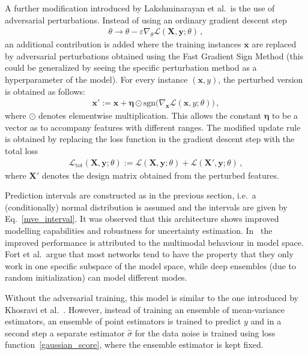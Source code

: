 \documentclass[smallcondensed]{svjour3}
\begin{document}
    A further modification introduced by Lakshminarayan et al.\ is the use of adversarial perturbations. Instead of using an ordinary gradient descent step
    \begin{gather}
        \theta\longrightarrow\theta - \varepsilon\nabla_\theta\mathcal{L}(\mathbf{X},\mathbf{y};\theta)\,,
    \end{gather}
    an additional contribution is added where the training instances $\mathbf{x}$ are replaced by adversarial perturbations obtained using the Fast Gradient Sign Method \cite{FGSM} (this could be generalized by seeing the specific perturbation method as a hyperparameter of the model). For every instance $(\mathbf{x},y)$, the perturbed version is obtained as follows:
    \begin{gather}
        \mathbf{x}' := \mathbf{x} + \boldsymbol{\eta}\odot\text{sgn}\big(\nabla_{\mathbf{x}}\mathcal{L}(\mathbf{x},y;\theta)\big)\label{fgsm}\,,
    \end{gather}
    where $\odot$ denotes elementwise multiplication. This allows the constant $\boldsymbol{\eta}$ to be a vector as to accompany features with different ranges. The modified update rule is obtained by replacing the loss function in the gradient descent step with the total loss
    \begin{gather}
        \mathcal{L}_\text{tot}(\mathbf{X},\mathbf{y};\theta) := \mathcal{L}(\mathbf{X},\mathbf{y};\theta) + \mathcal{L}(\mathbf{X}',\mathbf{y};\theta)\,,
    \end{gather}
    where $\mathbf{X}'$ denotes the design matrix obtained from the perturbed features.

    Prediction intervals are constructed as in the previous section, i.e.\ a (conditionally) normal distribution is assumed and the intervals are given by Eq.~\eqref{mve_interval}. It was observed that this architecture shows improved modelling capabilities and robustness for uncertainty estimation. In~\cite{fort2019deep} the improved performance is attributed to the multimodal behaviour in model space. Fort et al.\ argue that most networks tend to have the property that they only work in one specific subspace of the model space, while deep ensembles (due to random initialization) can model different modes.

    Without the adversarial training, this model is similar to the one introduced by Khosravi et al.~\cite{khosravi2014constructing}. However, instead of training an ensemble of mean-variance estimators, an ensemble of point estimators is trained to predict $y$ and in a second step a separate estimator $\hat{\sigma}$ for the data noise is trained using loss function~\eqref{gaussian_score}, where the ensemble estimator is kept fixed.
\end{document}
